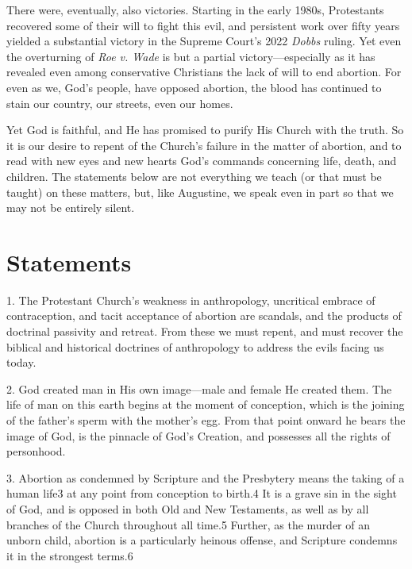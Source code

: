 \documentclass[
]{book}
\begin{document}
There were, eventually, also victories. Starting in the early 1980s, Protestants recovered some of their will to fight this evil, and persistent work over fifty years yielded a substantial victory in the Supreme Court's 2022 \emph{Dobbs} ruling. Yet even the overturning of \emph{Roe v. Wade} is but a partial victory---especially as it has revealed even among conservative Christians the lack of will to end abortion. For even as we, God's people, have opposed abortion, the blood has continued to stain our country, our streets, even our homes.

Yet God is faithful, and He has promised to purify His Church with the truth. So it is our desire to repent of the Church's failure in the matter of abortion, and to read with new eyes and new hearts God's commands concerning life, death, and children. The statements below are not everything we teach (or that must be taught) on these matters, but, like Augustine, we speak even in part so that we may not be entirely silent.

\hypertarget{statements}{%
\section*{Statements}\label{statements}}

\protect\hypertarget{dda-statement-01}{\href{}{}}1. The Protestant Church's weakness in anthropology, uncritical embrace of contraception, and tacit acceptance of abortion are scandals, and the products of doctrinal passivity and retreat. From these we must repent, and must recover the biblical and historical doctrines of anthropology to address the evils facing us today.

\protect\hypertarget{dda-statement-02}{\href{}{}}2. God created man in His own image---male and female He created them. The life of man on this earth begins at the moment of conception, which is the joining of the father's sperm with the mother's egg. From that point onward he bears the image of God, is the pinnacle of God's Creation, and possesses all the rights of personhood.

\protect\hypertarget{dda-statement-03}{\href{}{}}3. Abortion as condemned by Scripture and the Presbytery means the taking of a human life3 at any point from conception to birth.4 It is a grave sin in the sight of God, and is opposed in both Old and New Testaments, as well as by all branches of the Church throughout all time.5 Further, as the murder of an unborn child, abortion is a particularly heinous offense, and Scripture condemns it in the strongest terms.6
\end{document}
